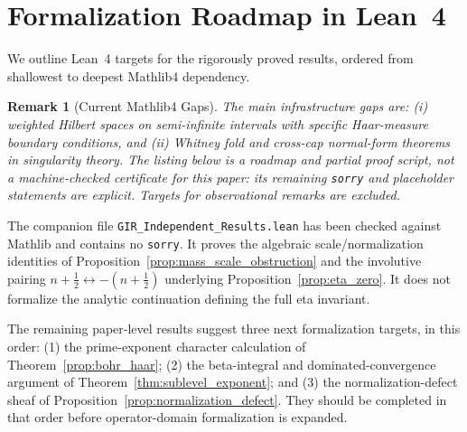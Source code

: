\documentclass[11pt]{article}
\newtheorem{remark}[theorem]{Remark}
\begin{document}
\section{Formalization Roadmap in Lean~4}
\label{sec:formalization}
We outline Lean~4 targets for the rigorously proved results, ordered from
shallowest to deepest Mathlib4 dependency.

\begin{remark}[Current Mathlib4 Gaps]
The main infrastructure gaps are: (i) weighted Hilbert spaces on semi-infinite
intervals with specific Haar-measure boundary conditions, and (ii) Whitney fold
and cross-cap normal-form theorems in singularity theory.  The listing below is
a roadmap and partial proof script, not a machine-checked certificate for this
paper: its remaining \texttt{sorry} and placeholder statements are explicit.
Targets for observational remarks are excluded.
\end{remark}

The companion file \texttt{GIR\_Independent\_Results.lean} has been checked
against Mathlib and contains no \texttt{sorry}.  It proves the algebraic
scale/normalization identities of
Proposition~\ref{prop:mass_scale_obstruction} and the involutive pairing
$n+\tfrac12\leftrightarrow-(n+\tfrac12)$ underlying
Proposition~\ref{prop:eta_zero}.  It does not formalize the analytic
continuation defining the full eta invariant.

The remaining paper-level results suggest three next formalization targets, in
this order: (1) the prime-exponent character calculation of
Theorem~\ref{prop:bohr_haar}; (2) the beta-integral and dominated-convergence argument of
Theorem~\ref{thm:sublevel_exponent}; and (3) the normalization-defect sheaf of
Proposition~\ref{prop:normalization_defect}.  They should be completed in that
order before operator-domain formalization is expanded.
\end{document}
